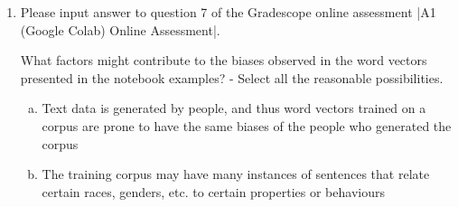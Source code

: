 \begin{enumerate}[1.]

\item {}

Please input answer to question 7 of the Gradescope online assessment |A1 (Google Colab) Online Assessment|.

What factors might contribute to the biases observed in the word vectors presented in the notebook examples? - Select all the reasonable possibilities.

\begin{enumerate}[a.]
\item Text data is generated by people, and thus word vectors trained on a corpus are prone to have the same biases of the people who generated the corpus 
\item The training corpus may have many instances of sentences that relate certain races, genders, etc. to certain properties or behaviours
\end{enumerate}


\end{enumerate}
